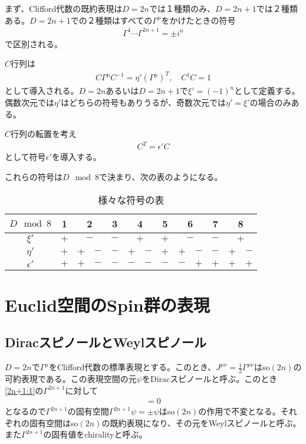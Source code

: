 \documentclass[12pt,a4paper]{jlreq}
\begin{document}
まず、Clifford代数の既約表現は$D=2n$では１種類のみ、$D=2n+1$では２種類ある。$D=2n+1$での２種類はすべての$\Gamma^{\mu}$をかけたときの符号
\begin{align*}
  \Gamma^{1}\cdots \Gamma^{2n+1}=\pm i^n
\end{align*}
で区別される。

$C$行列は
\begin{align*}
  C\Gamma^{\mu}C^{-1}=\eta'(\Gamma^{\mu})^T,\quad
  C^{\dag}C=1
\end{align*}
として導入される。$D=2n$あるいは$D=2n+1$で$\xi'=(-1)^n$として定義する。偶数次元では$\eta'$はどちらの符号もありうるが、奇数次元では$\eta'=\xi'$の場合のみある。

$C$行列の転置を考え
\begin{align*}
  C^{T}=\epsilon' C
\end{align*}
として符号$\epsilon'$を導入する。

これらの符号は$D \mod 8$で決まり、次の表のようになる。
\begin{table}[htb]
\begin{center}
  \begin{tabular}{|c|c|c|c|c|c|c|c|c|c|c|c|c|}\hline
    $D \mod 8$ & 1 & \multicolumn{2}{|c|}{2} & 3 & \multicolumn{2}{|c|}{4} & 5 & \multicolumn{2}{|c|}{6} & 7 & \multicolumn{2}{|c|}{8} \\ \hline
    $\xi'$ & $+$ & \multicolumn{2}{|c|}{$-$} & $-$ & \multicolumn{2}{|c|}{$+$} & $+$ & \multicolumn{2}{|c|}{$-$} & $-$ & \multicolumn{2}{|c|}{$+$} \\\hline
    $\eta'$ & $+$ & $+$ & $-$ &  $-$ & $+$ & $-$ & $+$ & $+$ & $-$ & $-$ & $+$ & $-$ \\ \hline
    $\epsilon'$ & $+$ & $+$ & $-$ & $-$ & $-$ & $-$ & $-$ & $-$ & $+$ & $+$ & $+$ & $+$ \\ \hline
  \end{tabular}
\end{center} 
\caption{様々な符号の表}
\label{sign}
\end{table}

\section{Euclid空間のSpin群の表現}
\subsection{DiracスピノールとWeylスピノール}
$D=2n$で$\Gamma^{\mu}$をClifford代数の標準表現とする。このとき、$J^{\mu\nu}=\frac12 \Gamma^{\mu\nu}$はso$(2n)$の可約表現である。この表現空間の元$\psi$をDiracスピノールと呼ぶ。このとき\eqref{2n+1:1}の$\Gamma^{2n+1}$に対して
\begin{align*}
  [\Gamma^{2n+1},J^{\mu\nu}]=0
\end{align*}
となるので$\Gamma^{2n+1}$の固有空間$\Gamma^{2n+1}\psi=\pm \psi$はso$(2n)$の作用で不変となる。それぞれの固有空間はso$(2n)$の既約表現になり、その元をWeylスピノールと呼ぶ。また$\Gamma^{2n+1}$の固有値をchiralityと呼ぶ。
\end{document}
